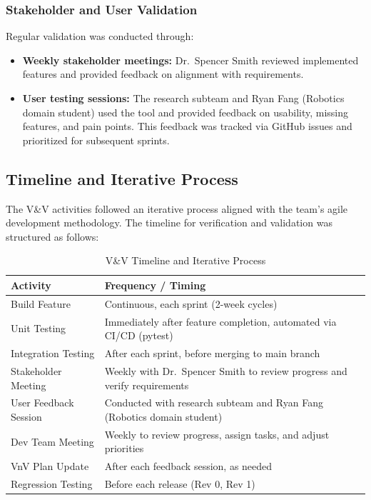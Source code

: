 \documentclass[12pt, titlepage]{article}
\begin{document}
\subsubsection{Stakeholder and User Validation}
Regular validation was conducted through:
\begin{itemize}
  \item \textbf{Weekly stakeholder meetings:} Dr.~Spencer Smith reviewed
  implemented features and provided feedback on alignment with requirements.

  \item \textbf{User testing sessions:} The research subteam and Ryan Fang
  (Robotics domain student) used the tool and provided feedback on usability,
  missing features, and pain points. This feedback was tracked via GitHub
  issues and prioritized for subsequent sprints.
\end{itemize}

\subsection{Timeline and Iterative Process}
\label{subsec:timeline}

The V\&V activities followed an iterative process aligned with the team's agile development methodology. The timeline for verification and validation was structured as follows:

\begin{table}[H]
\centering
\caption{V\&V Timeline and Iterative Process}
\label{tab:vnv-timeline}
\begin{tabular}{|p{4cm}|p{10cm}|}
\hline
\textbf{Activity} & \textbf{Frequency / Timing} \\
\hline
Build Feature & Continuous, each sprint (2-week cycles) \\
\hline
Unit Testing & Immediately after feature completion, automated via CI/CD (pytest) \\
\hline
Integration Testing & After each sprint, before merging to main branch \\
\hline
Stakeholder Meeting & Weekly with Dr.~Spencer Smith to review progress and verify requirements \\
\hline
User Feedback Session & Conducted with research subteam and Ryan Fang (Robotics domain student) \\
\hline
Dev Team Meeting & Weekly to review progress, assign tasks, and adjust priorities \\
\hline
VnV Plan Update & After each feedback session, as needed \\
\hline
Regression Testing & Before each release (Rev 0, Rev 1) \\
\hline
\end{tabular}
\end{table}
\end{document}
